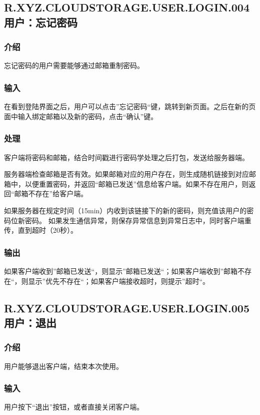 \subsection{R.XYZ.CLOUDSTORAGE.USER.LOGIN.004 用户：忘记密码 }
\subsubsection{介绍}
忘记密码的用户需要能够通过邮箱重制密码。

\subsubsection{输入}
在看到登陆界面之后，用户可以点击”忘记密码“键，跳转到新页面。之后在新的页面中输入绑定邮箱以及新的密码，点击“确认”键。

\subsubsection{处理}
客户端将密码和邮箱，结合时间戳进行密码学处理之后打包，发送给服务器端。

服务器端检查邮箱是否有效。如果邮箱对应的用户存在，则生成随机链接到对应邮箱中，以便重置密码，并返回“邮箱已发送”信息给客户端。如果不存在用户，则返回“邮箱不存在”给客户端。

如果服务器在规定时间（15min）内收到该链接下的新的密码，则充值该用户的密码位新密码。
如果发生通信异常，则保存异常信息到异常日志中，同时客户端重传，直到超时（20秒）。

\subsubsection{输出}
如果客户端收到”邮箱已发送“，则显示”邮箱已发送“；如果客户端收到”邮箱不存在“，则显示”优先不存在“；如果客户端接收超时，则提示”超时“。

\subsection{R.XYZ.CLOUDSTORAGE.USER.LOGIN.005 用户：退出 }

\subsubsection{介绍}
用户能够退出客户端，结束本次使用。

\subsubsection{输入}
用户按下“退出”按钮，或者直接关闭客户端。

